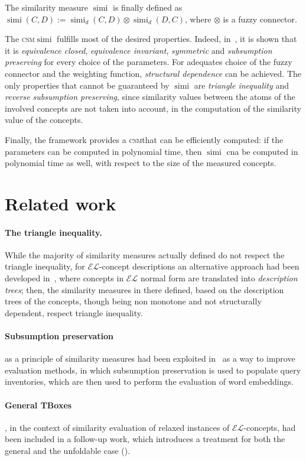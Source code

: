 \documentclass[]{llncs}
\DeclareMathOperator{\simi}{simi}
\theoremstyle{remark}
\newcommand{\el}{\(\mathcal{EL}{}\)}
\newcommand{\csm}{\textsc{csm}}
\begin{document}
  The similarity measure \(\simi\) is finally defined as \(\simi(C,D) := \simi_d(C,D) \otimes \simi_d(D,C)\), where \(\otimes{}\) is a fuzzy connector.

  The \csm \(\simi\) fulfills most of the desired properties.
  Indeed, in~\cite{LeTu12}, it is shown that it is \emph{equivalence closed}, \emph{equivalence invariant}, \emph{symmetric} and \emph{subsumption preserving} for every choice of the parameters.
  For adequates choice of the fuzzy connector and the weighting function, \emph{structural dependence} can be achieved.
  The only properties that cannot be guaranteed by \(\simi\) are \emph{triangle inequality} and \emph{reverse subsumption preserving}, since similarity values between the atoms of the involved concepts are not taken into account, in the computation of the similarity value of the concepts.

  Finally, the framework provides a \csm that can be efficiently computed: if the parameters can be computed in polynomial time, then \(\simi\) cna be computed in polynomial time as well, with respect to the size of the measured concepts.

  \section{Related work}

  \paragraph{The triangle inequality.} While the majority of similarity measures actually defined do not respect the triangle inequality, for \el-concept descriptions an alternative approach had been developed in~\cite{DAB14}, where concepts in \el{} normal form are translated into \emph{description trees}; then, the similarity measures in there defined, based on the description trees of the concepts, though being non monotone and not structurally dependent, respect triangle inequality.

  \paragraph{Subsumption preservation} as a principle of similarity measures had been exploited in~\cite{Se16} as a way to improve evaluation methods, in which subsumption preservation is used to populate query inventories, which are then used to perform the evaluation of word embeddings.

  \paragraph{General TBoxes}, in the context of similarity evaluation of relaxed instances of \el-concepts, had been included in a follow-up work, which introduces a treatment for both the general and the unfoldable case (\cite{Ec14}).
\end{document}
